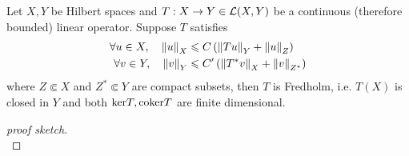 \documentclass{article}
\begin{document}
\begin{ftheorem}
Let $X, Y$ be Hilbert spaces and $T: X \to Y \in \L(X, Y)$ be a continuous (therefore bounded) linear operator. Suppose $T$ satisfies 
\begin{align*}
\forall u \in X, \quad \norm[u]_{X} &\leq C \brac{\norm[Tu]_Y + \norm[u]_Z} \\
\forall v \in Y, \quad \norm[v]_{Y} &\leq C' \brac{\norm[T^*v]_X + \norm[v]_{Z^*}}
\end{align*}
where $Z \Subset X$ and $Z^* \Subset Y$ are compact subsets, then $T$ is Fredholm, i.e. $T(X)$ is closed in $Y$ and both $\ker T, \coker T$ are finite dimensional. 
\end{ftheorem}
\begin{proof}[proof sketch] \hfill \\ 


\end{proof}
\end{document}
